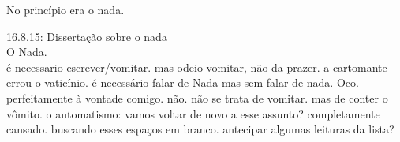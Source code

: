 \begin{poem}
\begin{stanza}
\qquad No princípio\verseline
\qquad \qquad era o nada.
\end{stanza}
\end{poem}

\par\null\vfill
\begin{flushleft}
16.8.15: Dissertação sobre o nada\\
\qquad O Nada.\\
é necessario escrever/vomitar. mas odeio vomitar, não da prazer. a cartomante errou o vaticínio. é necessário falar de Nada mas sem falar de nada. Oco. perfeitamente à vontade comigo. não. não se trata de vomitar. mas de conter o vômito. o automatismo: vamos voltar de novo a esse assunto? completamente cansado. buscando esses espaços em branco. antecipar algumas leituras da lista?
\end{flushleft}